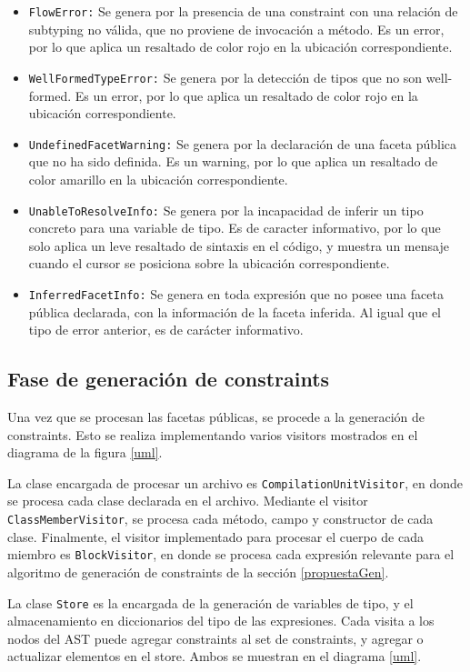 \begin{itemize}
  \item \texttt{FlowError:} Se genera por la presencia de una constraint con una relación de subtyping no válida, que no proviene de invocación a método. Es un error, por lo que aplica un resaltado de color rojo en la ubicación correspondiente.
  \item \texttt{WellFormedTypeError:} Se genera por la detección de tipos que no son well-formed. Es un error, por lo que aplica un resaltado de color rojo en la ubicación correspondiente.
  \item \texttt{UndefinedFacetWarning:} Se genera por la declaración de una faceta pública que no ha sido definida. Es un warning, por lo que aplica un resaltado de color amarillo en la ubicación correspondiente.
  \item \texttt{UnableToResolveInfo:} Se genera por la incapacidad de inferir un tipo concreto para una variable de tipo. Es de caracter informativo, por lo que solo aplica un leve resaltado de sintaxis en el código, y muestra un mensaje cuando el cursor se posiciona sobre la ubicación correspondiente.
  \item \texttt{InferredFacetInfo:} Se genera en toda expresión que no posee una faceta pública declarada, con la información de la faceta inferida. Al igual que el tipo de error anterior, es de carácter informativo.
\end{itemize}

\subsection{Fase de generación de constraints}
Una vez que se procesan las facetas públicas, se procede a la generación de constraints. Esto se realiza implementando varios visitors mostrados en el diagrama de la figura \ref{uml}.

La clase encargada de procesar un archivo es \texttt{CompilationUnitVisitor}, en donde se procesa cada clase declarada en el archivo. Mediante el visitor \texttt{ClassMemberVisitor}, se procesa cada método, campo y constructor de cada clase. Finalmente, el visitor implementado para procesar el cuerpo de cada miembro es \texttt{BlockVisitor}, en donde se procesa cada expresión relevante para el algoritmo de generación de constraints de la sección \ref{propuestaGen}.

La clase \texttt{Store} es la encargada de la generación de variables de tipo, y el almacenamiento en diccionarios del tipo de las expresiones. Cada visita a los nodos del AST puede agregar constraints al set de constraints, y agregar o actualizar elementos en el store. Ambos se muestran en el diagrama \ref{uml}.


